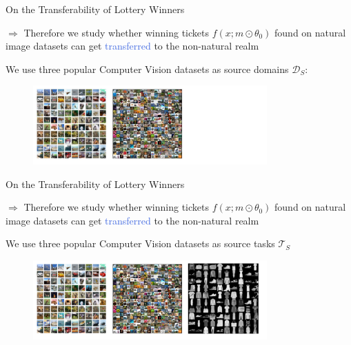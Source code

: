 \documentclass{beamer}
\begin{document}
\begin{frame}{On the Transferability of Lottery Winners}

	$\Rightarrow$ Therefore we study whether winning tickets $f(x;m \odot \theta_0)$
	found on natural image datasets can get \textcolor{RoyalBlue}{transferred} to the non-natural realm

	\bigskip

	We use three popular Computer Vision datasets as source domains $\mathcal{D}_S$:

	\begin{figure}
 \includegraphics[width=0.8\textwidth]{figures/cifar100}
\end{figure}
\end{frame}

\begin{frame}{On the Transferability of Lottery Winners}

	$\Rightarrow$ Therefore we study whether winning tickets $f(x;m \odot \theta_0)$
	found on natural image datasets can get \textcolor{RoyalBlue}{transferred} to the non-natural realm

	\bigskip

	We use three popular Computer Vision datasets as source tasks $\mathcal{T}_S$

	\begin{figure}
 \includegraphics[width=0.8\textwidth]{figures/fashion_mnist}
\end{figure}
\end{frame}
\end{document}
